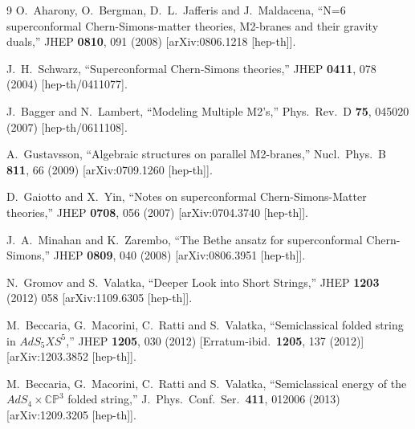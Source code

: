 \documentclass[a4paper,11pt]{article}
\numberwithin{equation}{section}
\begin{document}
\begin{thebibliography} {9}
  O.~Aharony, O.~Bergman, D.~L.~Jafferis and J.~Maldacena,
  ``N=6 superconformal Chern-Simons-matter theories, M2-branes and their gravity duals,''
  JHEP {\bf 0810}, 091 (2008)
  [arXiv:0806.1218 [hep-th]].

  J.~H.~Schwarz,
  ``Superconformal Chern-Simons theories,''
  JHEP {\bf 0411}, 078 (2004)
  [hep-th/0411077].

  J.~Bagger and N.~Lambert,
  ``Modeling Multiple M2's,''
  Phys.\ Rev.\ D {\bf 75}, 045020 (2007)
  [hep-th/0611108].

  A.~Gustavsson,
  ``Algebraic structures on parallel M2-branes,''
  Nucl.\ Phys.\ B {\bf 811}, 66 (2009)
  [arXiv:0709.1260 [hep-th]].

  D.~Gaiotto and X.~Yin,
  ``Notes on superconformal Chern-Simons-Matter theories,''
  JHEP {\bf 0708}, 056 (2007)
  [arXiv:0704.3740 [hep-th]].

  J.~A.~Minahan and K.~Zarembo,
  ``The Bethe ansatz for superconformal Chern-Simons,''
  JHEP {\bf 0809}, 040 (2008)
  [arXiv:0806.3951 [hep-th]].

  N.~Gromov and S.~Valatka,
  ``Deeper Look into Short Strings,''
  JHEP {\bf 1203} (2012) 058
  [arXiv:1109.6305 [hep-th]].

  M.~Beccaria, G.~Macorini, C.~Ratti and S.~Valatka,
  ``Semiclassical folded string in $AdS_5 X S^5$,''
  JHEP {\bf 1205}, 030 (2012)
  [Erratum-ibid.\  {\bf 1205}, 137 (2012)]
  [arXiv:1203.3852 [hep-th]].

  M.~Beccaria, G.~Macorini, C.~Ratti and S.~Valatka,
  ``Semiclassical energy of the $AdS_4 \times \mathbb{CP}^3$ folded string,''
  J.\ Phys.\ Conf.\ Ser.\  {\bf 411}, 012006 (2013)
  [arXiv:1209.3205 [hep-th]].


\end{thebibliography}
\end{document}
